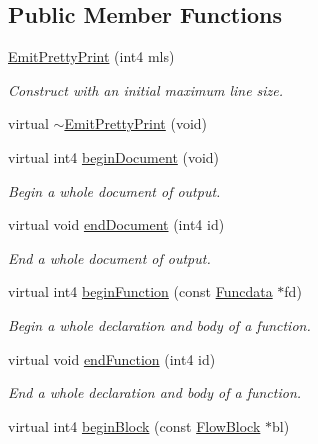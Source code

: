 \subsection*{Public Member Functions}
\begin{DoxyCompactItemize}
\item 
\mbox{\hyperlink{class_emit_pretty_print_a232b39ecc32d329fce5142dd3ef12f9e}{Emit\+Pretty\+Print}} (int4 mls)
\begin{DoxyCompactList}\small\item\em Construct with an initial maximum line size. \end{DoxyCompactList}\item 
virtual \mbox{\hyperlink{class_emit_pretty_print_a5afa6d0fa8f63f0a23dd5eef4f1225f7}{$\sim$\+Emit\+Pretty\+Print}} (void)
\item 
virtual int4 \mbox{\hyperlink{class_emit_pretty_print_a7d26817d23a381a55e78d4c7caf225f1}{begin\+Document}} (void)
\begin{DoxyCompactList}\small\item\em Begin a whole document of output. \end{DoxyCompactList}\item 
virtual void \mbox{\hyperlink{class_emit_pretty_print_aca37d689adabda9dd84cc333c87cabd8}{end\+Document}} (int4 id)
\begin{DoxyCompactList}\small\item\em End a whole document of output. \end{DoxyCompactList}\item 
virtual int4 \mbox{\hyperlink{class_emit_pretty_print_afc7d7ad8e92e3aebb5098ab3aa90153d}{begin\+Function}} (const \mbox{\hyperlink{class_funcdata}{Funcdata}} $\ast$fd)
\begin{DoxyCompactList}\small\item\em Begin a whole declaration and body of a function. \end{DoxyCompactList}\item 
virtual void \mbox{\hyperlink{class_emit_pretty_print_a191b3722b5a08d9650dc7dc1216eac9d}{end\+Function}} (int4 id)
\begin{DoxyCompactList}\small\item\em End a whole declaration and body of a function. \end{DoxyCompactList}\item 
virtual int4 \mbox{\hyperlink{class_emit_pretty_print_a751c7bb68c0557dc40cc2b1a2cb5a85f}{begin\+Block}} (const \mbox{\hyperlink{class_flow_block}{Flow\+Block}} $\ast$bl)

\end{DoxyCompactItemize}

